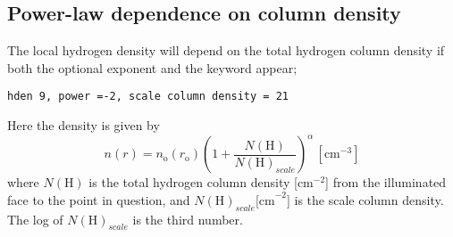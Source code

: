 \subsection{Power-law dependence on column density }

The local hydrogen density will depend on the total hydrogen column
density if both the optional exponent and the keyword
 appear;
\begin{verbatim}
hden 9, power =-2, scale column density = 21
\end{verbatim}
Here the density is given by
\begin{equation}
n\left( r \right) = n_{\mathrm{o}} \left( {r_{\mathrm{o}} } \right)\left( {1 +
\frac{{N\left( {\mathrm{H}} \right)}}{{N\left( {\mathrm{H}} \right)_{scale} }}}
\right)^\alpha  \, [\mathrm{cm}^{-3}]%
\end{equation}
where $N(\mathrm{H})$ is the total hydrogen column density [cm$^{-2}$] from the illuminated
face to the point in question, and $N(\mathrm{H})_{scale}\mathrm{[cm}^{-2}$] is the scale column
density.
The log of $N(\mathrm{H})_{scale}$ is the third number.

